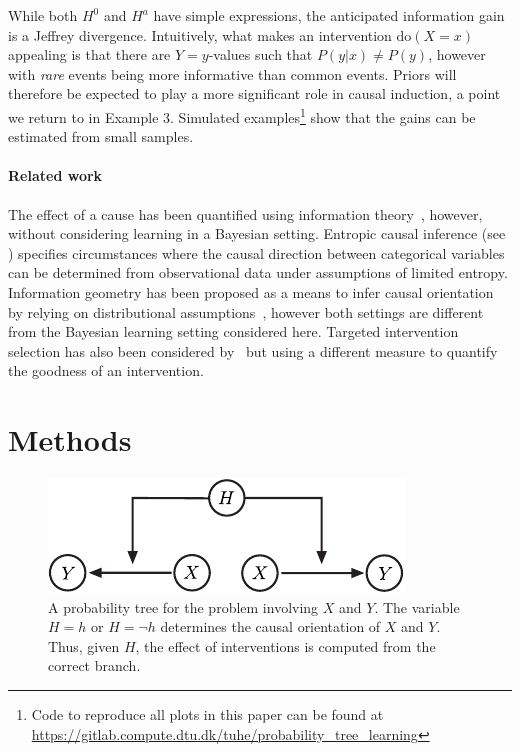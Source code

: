 \documentclass[letterpaper]{article} %
\newcommand{\doo}{\textrm{do}}
\begin{document}
While both $H^0$ and $H^a$ have simple expressions, the anticipated information gain is a Jeffrey divergence.
  Intuitively, what makes an intervention $\doo(X=x)$ appealing is that there are $Y=y$-values such that $P(y|x) \neq P(y)$, however with \emph{rare} events being more informative than common events. 
 Priors will therefore be expected to play a more significant role in causal induction, a point we return to in Example 3. 
  Simulated examples\footnote{Code to reproduce all plots in this paper can be found at \url{https://gitlab.compute.dtu.dk/tuhe/probability_tree_learning}} show that  the gains can be estimated from small samples.


\paragraph{Related work}
The effect of a cause has been quantified using information theory~\cite{wieczorek2019information}, however, without considering learning in a Bayesian setting. Entropic causal inference (see \cite{compton2021entropic}) specifies circumstances where the causal direction between categorical variables can be determined from observational data under assumptions of limited entropy. Information geometry has been proposed as a means to infer causal orientation by relying on distributional assumptions~\cite{janzing2012information}, however both settings are different from the Bayesian learning setting considered here. Targeted intervention selection has also been considered by~\cite{agrawal2019abcd,tong2001active} but using a different measure to quantify the goodness of an intervention.
















\section{Methods} 

\begin{figure}[t!]
	\centering
	\includegraphics[width=.85\linewidth]{fig2svg-crop}
	\caption{A probability tree for the problem involving $X$ and $Y$. The variable $H = h$ or $H = \neg h$ determines the causal orientation of $X$ and $Y$. Thus, given $H$, the effect of interventions is computed from the correct branch. }\label{fig2svg}
\end{figure}
\end{document}
